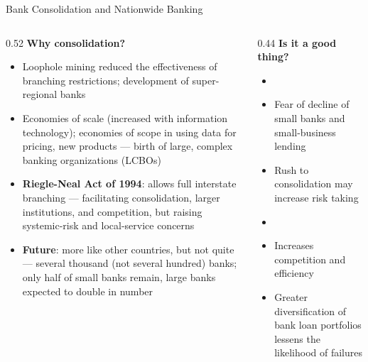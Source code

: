 \documentclass[aspectratio=169]{beamer}
\begin{document}
\begin{frame}{Bank Consolidation and Nationwide Banking}
\begin{columns}
\begin{column}{0.52\textwidth}
\textbf{Why consolidation?}
\begin{itemize}\small
  \item Loophole mining reduced the effectiveness of branching restrictions; development of super-regional banks
  \item Economies of scale (increased with information technology); economies of scope in using data for pricing, new products --- birth of large, complex banking organizations (LCBOs)
  \item \textbf{Riegle-Neal Act of 1994}: allows full interstate branching --- facilitating consolidation, larger institutions, and competition, but raising systemic-risk and local-service concerns
  \item \textbf{Future}: more like other countries, but not quite --- several thousand (not several hundred) banks; only half of small banks remain, large banks expected to double in number
\end{itemize}
\end{column}
\begin{column}{0.44\textwidth}
\textbf{Is it a good thing?}
\begin{itemize}\small
  \item[\textbf{Cons:}]
  \item Fear of decline of small banks and small-business lending
  \item Rush to consolidation may increase risk taking
  \item[\textbf{Pros:}]
  \item Increases competition and efficiency
  \item Greater diversification of bank loan portfolios lessens the likelihood of failures
\end{itemize}
\end{column}
\end{columns}
\end{frame}
\end{document}
